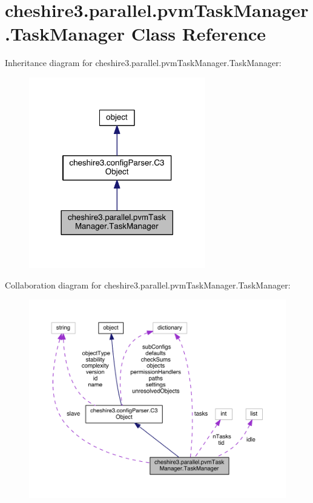 \hypertarget{classcheshire3_1_1parallel_1_1pvm_task_manager_1_1_task_manager}{\section{cheshire3.\-parallel.\-pvm\-Task\-Manager.\-Task\-Manager Class Reference}
\label{classcheshire3_1_1parallel_1_1pvm_task_manager_1_1_task_manager}
}


Inheritance diagram for cheshire3.\-parallel.\-pvm\-Task\-Manager.\-Task\-Manager\-:
\nopagebreak
\begin{figure}[H]
\begin{center}
\leavevmode
\includegraphics[width=218pt]{classcheshire3_1_1parallel_1_1pvm_task_manager_1_1_task_manager__inherit__graph}
\end{center}
\end{figure}


Collaboration diagram for cheshire3.\-parallel.\-pvm\-Task\-Manager.\-Task\-Manager\-:
\nopagebreak
\begin{figure}[H]
\begin{center}
\leavevmode
\includegraphics[width=350pt]{classcheshire3_1_1parallel_1_1pvm_task_manager_1_1_task_manager__coll__graph}
\end{center}
\end{figure}
